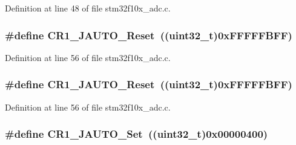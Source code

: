 Definition at line 48 of file stm32f10x\+\_\+adc.\+c.

\subsubsection[{\texorpdfstring{C\+R1\+\_\+\+J\+A\+U\+T\+O\+\_\+\+Reset}{CR1_JAUTO_Reset}}]{\setlength{\rightskip}{0pt plus 5cm}\#define C\+R1\+\_\+\+J\+A\+U\+T\+O\+\_\+\+Reset~(({\bf uint32\+\_\+t})0x\+F\+F\+F\+F\+F\+B\+F\+F)}\hypertarget{group___a_d_c___private___defines_gab6c4a9f0a661bf7c5add35ea3a90b756}{}\label{group___a_d_c___private___defines_gab6c4a9f0a661bf7c5add35ea3a90b756}


Definition at line 56 of file stm32f10x\+\_\+adc.\+c.

\subsubsection[{\texorpdfstring{C\+R1\+\_\+\+J\+A\+U\+T\+O\+\_\+\+Reset}{CR1_JAUTO_Reset}}]{\setlength{\rightskip}{0pt plus 5cm}\#define C\+R1\+\_\+\+J\+A\+U\+T\+O\+\_\+\+Reset~(({\bf uint32\+\_\+t})0x\+F\+F\+F\+F\+F\+B\+F\+F)}\hypertarget{group___a_d_c___private___defines_gab6c4a9f0a661bf7c5add35ea3a90b756}{}\label{group___a_d_c___private___defines_gab6c4a9f0a661bf7c5add35ea3a90b756}


Definition at line 56 of file stm32f10x\+\_\+adc.\+c.

\subsubsection[{\texorpdfstring{C\+R1\+\_\+\+J\+A\+U\+T\+O\+\_\+\+Set}{CR1_JAUTO_Set}}]{\setlength{\rightskip}{0pt plus 5cm}\#define C\+R1\+\_\+\+J\+A\+U\+T\+O\+\_\+\+Set~(({\bf uint32\+\_\+t})0x00000400)}\hypertarget{group___a_d_c___private___defines_gaa8478f12e212738e249a7fafb69d4dd4}{}\label{group___a_d_c___private___defines_gaa8478f12e212738e249a7fafb69d4dd4}


